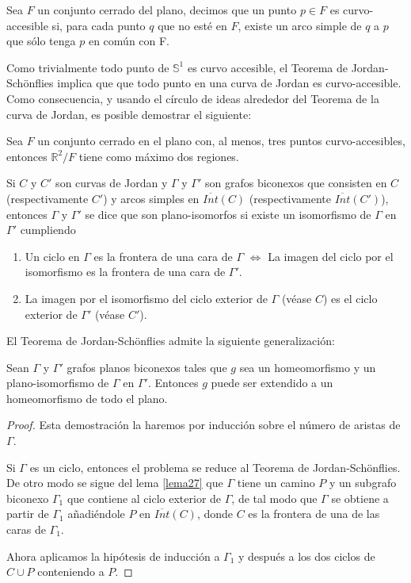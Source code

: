 \begin{definition}
	Sea $F$ un conjunto cerrado del plano, decimos que un punto $p \in F$ es curvo-accesible si, para cada punto $q$ que no esté en $F$, existe un arco simple de $q$ a $p$ que sólo tenga $p$ en común con F.
\end{definition}

Como trivialmente todo punto de $\mathbb{S}^1$ es curvo accesible, el Teorema de Jordan-Schönflies implica que que todo punto en una curva de Jordan es curvo-accesible. Como consecuencia, y usando el círculo de ideas alrededor del Teorema de la curva de Jordan, es posible demostrar el siguiente:

\begin{theorem}
	Sea $F$ un conjunto cerrado en el plano con, al menos, tres puntos curvo-accesibles, entonces $\mathbb{R}^2 / F$ tiene como máximo dos regiones.
\end{theorem}

\begin{definition}
	Si $C$ y $C'$ son curvas de Jordan y $\Gamma$ y $\Gamma'$ son grafos biconexos que consisten en $C$ (respectivamente $C'$) y arcos   simples en $\overline{Int}(C)$ (respectivamente $\overline{Int}(C')$), entonces $\Gamma$ y $\Gamma'$ se dice que son plano-isomorfos si existe un isomorfismo de $\Gamma$ en $\Gamma'$ cumpliendo 
\begin{enumerate}
	\item Un ciclo en $\Gamma$ es la frontera de una cara de $\Gamma$     $\iff$ La imagen del ciclo por el isomorfismo es la frontera de una cara de $\Gamma'$.
	\item La imagen por el isomorfismo del ciclo exterior de $\Gamma$ (véase $C$) es el ciclo exterior de $\Gamma'$ (véase $C'$).
\end{enumerate}	
\end{definition}
El Teorema de Jordan-Schönflies admite la siguiente generalización:
\begin{theorem}\label{teorema33}
	Sean $\Gamma$ y $\Gamma'$ grafos planos biconexos tales que $g$ sea un homeomorfismo y un plano-isomorfismo de $\Gamma$ en $\Gamma'$. Entonces $g$ puede ser extendido a un homeomorfismo de todo el plano.
\end{theorem}

\begin{proof}
	Esta demostración la haremos por inducción sobre el número de aristas de $\Gamma$.

	Si $\Gamma$ es un ciclo, entonces el problema se reduce al Teorema de Jordan-Schönflies. De otro modo se sigue del lema \ref{lema27} que $\Gamma$ tiene un camino $P$ y un subgrafo biconexo $\Gamma_1$ que contiene al ciclo exterior de $\Gamma$, de tal modo que $\Gamma$ se obtiene a partir de $\Gamma_1$ añadiéndole $P$ en $\overline{Int}(C)$, donde $C$ es la frontera de una de las caras de $\Gamma_1$.

	Ahora aplicamos la hipótesis de inducción a $\Gamma_1$ y después a los dos ciclos de $C \cup P$ conteniendo a $P$.
\end{proof}
